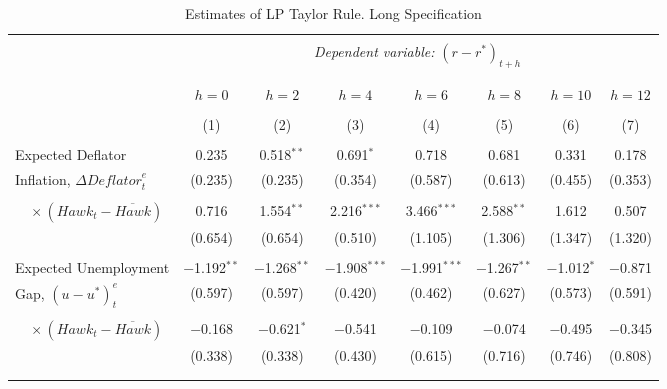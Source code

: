 \documentclass[11pt]{article}
\begin{document}
\begin{table}[!htbp] \centering \footnotesize
  \begin{threeparttable} \centering
    \caption{Estimates of LP Taylor Rule. Long Specification} 
    \label{tab:LP_long} 
    \begin{tabular}{@{\extracolsep{5pt}}lccccccc} 
      \\[-1.8ex]\hline 
      \hline \\[-1.8ex] 
      & \multicolumn{7}{c}{\textit{Dependent variable:} $\left(r-r^*\right)_{t+h}$} \\  
      \\[-1.8ex]
      \cline{2-8} 
      \\[-1.8ex] & $h=0$ & $h=2$ & $h=4$ & $h=6$ & $h=8$ & $h=10$ & $h=12$ \\ 
      \\[-1.8ex] & (1) & (2) & (3) & (4) & (5) & (6) & (7)\\ 
      \hline \\[-1.8ex] 
      Expected Deflator   & 0.235 & 0.518$^{**}$ & 0.691$^{*}$ & 0.718 & 0.681 & 0.331 & 0.178 \\ 
      Inflation, $\Delta\mathit{Deflator}_t^e$ & (0.235) & (0.235) & (0.354) & (0.587) & (0.613) & (0.455) & (0.353) \\ 
      & & & & & & & \\ 
      $\quad \times \left(\mathit{Hawk}_t-\overline{\mathit{Hawk}}\right)$ & 0.716 & 1.554$^{**}$ & 2.216$^{***}$ & 3.466$^{***}$ & 2.588$^{**}$ & 1.612 & 0.507 \\ 
      & (0.654) & (0.654) & (0.510) & (1.105) & (1.306) & (1.347) & (1.320) \\ 
      & & & & & & & \\ 
      Expected Unemployment & $-$1.192$^{**}$ & $-$1.268$^{**}$ & $-$1.908$^{***}$ & $-$1.991$^{***}$ & $-$1.267$^{**}$ & $-$1.012$^{*}$ & $-$0.871 \\ 
      Gap, $\left(u-u^*\right)_t^e$ & (0.597) & (0.597) & (0.420) & (0.462) & (0.627) & (0.573) & (0.591) \\ 
      & & & & & & & \\ 
      $\quad \times \left(\mathit{Hawk}_t-\overline{\mathit{Hawk}}\right)$& $-$0.168 & $-$0.621$^{*}$ & $-$0.541 & $-$0.109 & $-$0.074 & $-$0.495 & $-$0.345 \\ 
      & (0.338) & (0.338) & (0.430) & (0.615) & (0.716) & (0.746) & (0.808) \\ 
      & & & & & & & \\ 
      \hline \\[-1.8ex] 

\end{tabular}
\end{threeparttable}
\end{table}
\end{document}
